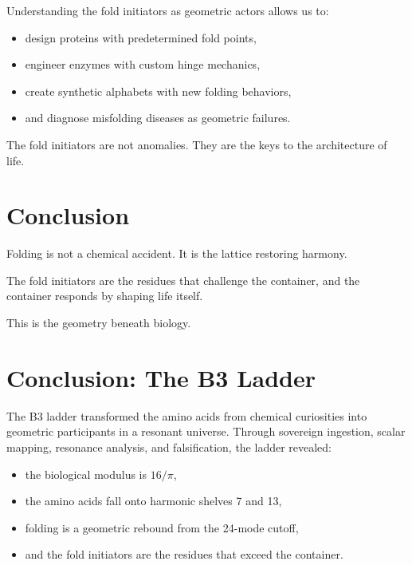 \documentclass[11pt, letterpaper, openany]{book}
\begin{document}
Understanding the fold initiators as geometric actors allows us to:

\begin{itemize}
    \item design proteins with predetermined fold points,
    \item engineer enzymes with custom hinge mechanics,
    \item create synthetic alphabets with new folding behaviors,
    \item and diagnose misfolding diseases as geometric failures.
\end{itemize}

The fold initiators are not anomalies.  
They are the keys to the architecture of life.

\section*{Conclusion}

Folding is not a chemical accident.  
It is the lattice restoring harmony.

The fold initiators are the residues that challenge the container, and the
container responds by shaping life itself.

This is the geometry beneath biology.


\section*{Conclusion: The B3 Ladder}

The B3 ladder transformed the amino acids from chemical curiosities into
geometric participants in a resonant universe. Through sovereign ingestion,
scalar mapping, resonance analysis, and falsification, the ladder revealed:

\begin{itemize}
    \item the biological modulus is $16/\pi$,
    \item the amino acids fall onto harmonic shelves 7 and 13,
    \item folding is a geometric rebound from the 24-mode cutoff,
    \item and the fold initiators are the residues that exceed the container.
\end{itemize}
\end{document}
